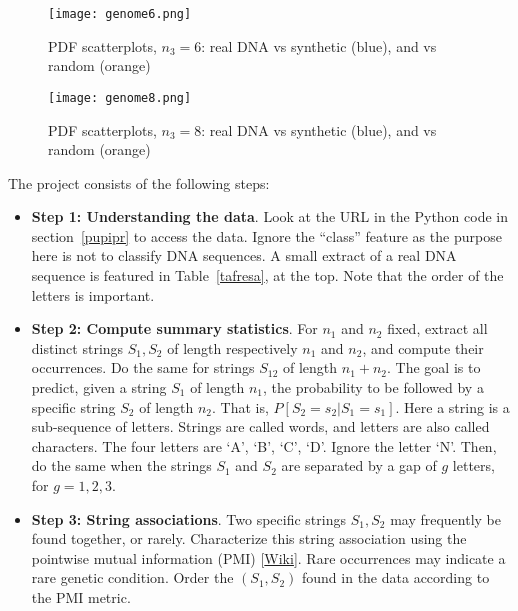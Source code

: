\documentclass[oneside,10pt]{book}
\begin{document}
\begin{figure}[H]
\centering
\texttt{[image: genome6.png]}   
\caption{PDF scatterplots, $n_3=6$: real DNA vs synthetic (blue), and vs random (orange)}
\label{rinyltualoer}
\end{figure}


\begin{figure}[H]
\centering
\texttt{[image: genome8.png]}   
\caption{PDF scatterplots, $n_3=8$: real DNA vs synthetic (blue), and vs random (orange)}
\label{fcasswelbwacxd}
\end{figure}

\noindent The project consists of the following steps: \vspace{1ex}

\begin{itemize}
\item[] {\bf Step 1:  Understanding the data}. Look at the URL in the Python code in section~\ref{pupipr} to access the data. Ignore the
 ``class'' feature as the purpose here is not to classify DNA sequences. A small extract of a real DNA sequence is featured in Table~\ref{tafresa}, at the top. Note that the order of the letters is important.
 \vspace{1ex}
\item[] {\bf Step 2: Compute summary statistics}.  For $n_1$ and $n_2$ fixed, extract all distinct strings $S_1, S_2$ of length respectively $n_1$ and $n_2$,
 and compute their occurrences. Do the same for strings $S_{12}$ of length $n_1+n_2$. The goal is to predict, given a string $S_1$ of length $n_1$, the probability
 to be followed by a specific string $S_2$ of length $n_2$. That is, $P[S_2 = s_2 | S_1 = s_1]$. Here a string is a sub-sequence of letters. Strings are  called words, and letters are also called characters.
 The four letters are `A', `B', `C', `D'. Ignore the letter `N'. Then, do the same when the strings $S_1$ and $S_2$ are separated by a gap of
 $g$ letters, for $g=1,2,3$.
\vspace{1ex} 
\item[] {\bf Step 3: String associations}. Two specific strings $S_1, S_2$ may frequently be found together, or rarely. Characterize this  string association using the \textcolor{index}{pointwise mutual information} (PMI) [\href{https://en.wikipedia.org/wiki/Pointwise_mutual_information}{Wiki}]. Rare
 occurrences may indicate a rare genetic condition. Order the $(S_1, S_2)$ found in the data according to the PMI metric.


\end{itemize}
\end{document}
